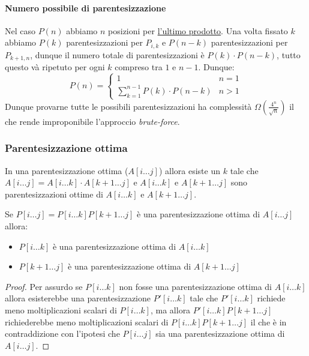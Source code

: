                 \paragraph{Numero possibile di parentesizzazione} Nel caso $P(n)$ abbiamo $n$ posizioni per \underline{l'ultimo prodotto}. Una volta fissato $k$ abbiamo $P(k)$ parentesizzazioni per $P_{i,k}$ e $P(n-k)$ parentesizzazioni per $P_{k+1,n}$, dunque il numero totale di parentesizzazioni è $P(k)\cdot P(n-k)$, tutto questo và ripetuto per ogni $k$ compreso tra $1$ e $n-1$. Dunque:
                $$
                    P(n)=\begin{cases}
                        1 & n=1\\
                        \sum_{k=1}^{n-1}P(k)\cdot P(n-k) & n>1
                    \end{cases}
                $$
                Dunque provarne tutte le possibili parentesizzazioni ha complessità $\Omega\left(\frac{4^n}{\sqrt{n}}\right)$ il che rende improponibile l'approccio \textit{brute-force}.
            \subsubsection{Parentesizzazione ottima}
                In una parentesizzazione ottima ($A[i\dots j]$) allora esiste un $k$ tale che $A[i\dots j]=A[i\dots k]\cdot A[k+1\dots j]$ e $A[i\dots k]$ e $A[k+1\dots j]$ sono parentesizzazioni ottime di $A[i\dots k]$ e $A[k+1\dots j]$.
                \begin{theorem}
                    Se $P[i\dots j]=P[i\dots k]P[k+1\dots j]$ è una parentesizzazione ottima di $A[i\dots j]$ allora:
                    \begin{itemize}
                        \item $P[i\dots k]$ è una parentesizzazione ottima di $A[i\dots k]$
                        \item $P[k+1\dots j]$ è una parentesizzazione ottima di $A[k+1\dots j]$
                    \end{itemize}
                \end{theorem}
                \begin{proof}
                    Per assurdo se $P[i\dots k]$ non fosse una parentesizzazione ottima di $A[i\dots k]$ allora esisterebbe una parentesizzazione $P'[i\dots k]$ tale che $P'[i\dots k]$ richiede meno moltiplicazioni scalari di $P[i\dots k]$, ma allora $P'[i\dots k]P[k+1\dots j]$ richiederebbe meno moltiplicazioni scalari di $P[i\dots k]P[k+1\dots j]$ il che è in contraddizione con l'ipotesi che $P[i\dots j]$ sia una parentesizzazione ottima di $A[i\dots j]$.
                \end{proof}
